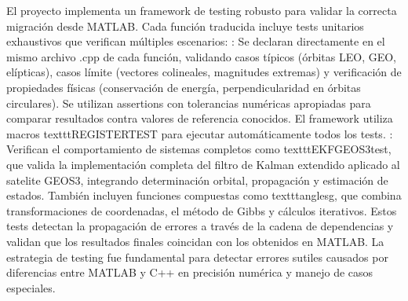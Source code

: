 \markdownRendererDocumentBegin
El proyecto implementa un framework de testing robusto para validar la correcta migración desde MATLAB. Cada función traducida incluye tests unitarios exhaustivos que verifican múltiples escenarios:\markdownRendererInterblockSeparator
{}: Se declaran directamente en el mismo archivo .cpp de cada función, validando casos típicos (órbitas LEO, GEO, elípticas), casos límite (vectores colineales, magnitudes extremas) y verificación de propiedades físicas (conservación de energía, perpendicularidad en órbitas circulares). Se utilizan assertions con tolerancias numéricas apropiadas para comparar resultados contra valores de referencia conocidos. El framework utiliza macros \markdownRendererBackslash{}texttt\markdownRendererLeftBrace{}REGISTER\markdownRendererUnderscore{}TEST\markdownRendererRightBrace{} para ejecutar automáticamente todos los tests.\markdownRendererInterblockSeparator
{}: Verifican el comportamiento de sistemas completos como \markdownRendererBackslash{}texttt\markdownRendererLeftBrace{}EKF\markdownRendererUnderscore{}GEOS3\markdownRendererUnderscore{}test\markdownRendererRightBrace{}, que valida la implementación completa del filtro de Kalman extendido aplicado al satelite GEOS3, integrando determinación orbital, propagación y estimación de estados. También incluyen funciones compuestas como \markdownRendererBackslash{}texttt\markdownRendererLeftBrace{}anglesg\markdownRendererRightBrace{}, que combina transformaciones de coordenadas, el método de Gibbs y cálculos iterativos. Estos tests detectan la propagación de errores a través de la cadena de dependencias y validan que los resultados finales coincidan con los obtenidos en MATLAB.\markdownRendererInterblockSeparator
{}La estrategia de testing fue fundamental para detectar errores sutiles causados por diferencias entre MATLAB y C++ en precisión numérica y manejo de casos especiales.\markdownRendererDocumentEnd